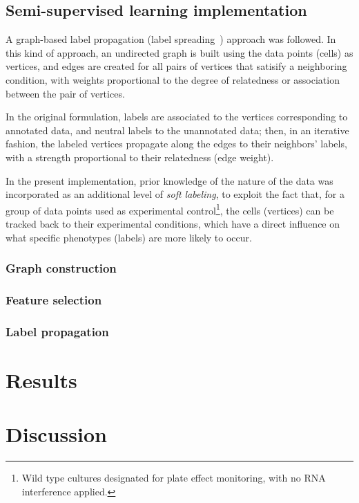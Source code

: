 \documentclass[oneside, a4paper, draft]{memoir} %
\begin{document}
\subsection{Semi-supervised learning implementation}
A graph-based label propagation (label spreading~\cite{zhou2004learning}) approach was followed. In this kind of approach, an undirected graph is built using the
data points (cells) as vertices, and edges are created for all pairs of vertices that satisify a neighboring condition, 
with weights proportional to the degree of relatedness or association between the pair of vertices.

In the original formulation, labels are associated to the vertices corresponding to annotated data, and neutral labels to
the unannotated data; then, in an iterative fashion, the labeled vertices propagate along the edges to their neighbors' labels,
with a strength proportional to their relatedness (edge weight).

In the present implementation, prior knowledge of the nature of the data was incorporated as an additional level of \emph{soft labeling}, to exploit
the fact that, for a group of data points used as experimental control\footnote{Wild type cultures designated for plate effect monitoring, with no RNA interference applied.},
the cells (vertices) can be tracked back to their experimental conditions, which have a direct influence on what specific phenotypes (labels) are more likely to occur.

\subsubsection{Graph construction}
\textcolor{gray}{\lipsum[32]}

\subsubsection{Feature selection}
\textcolor{gray}{\lipsum[88]}

\subsubsection{Label propagation}
\textcolor{gray}{\lipsum[44]}

\section{Results}
\textcolor{gray}{\lipsum[8]}

\section{Discussion}
\textcolor{gray}{\lipsum[9]}
\end{document}
